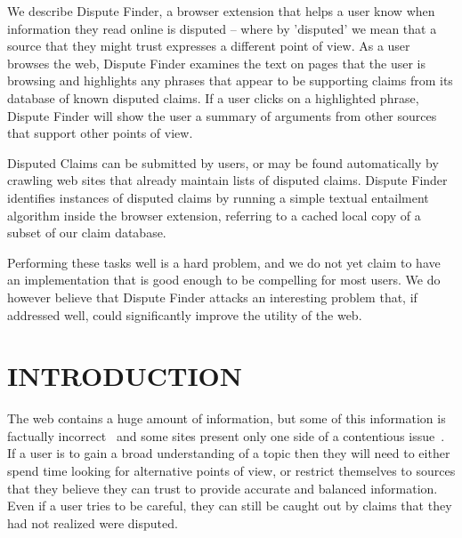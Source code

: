 \documentclass{www2010-submission}
\newcommand{\todo}[1]{}
\begin{document}
\abstract

We describe Dispute Finder, a browser extension that helps a user know when information they read online is disputed -- where by 'disputed' we mean that a source that they might trust expresses a different point of view.  As a user browses the web, Dispute Finder examines the text on pages that the user is browsing and highlights any phrases that appear to be supporting claims from its database of known disputed claims. If a user clicks on a highlighted phrase, Dispute Finder will show the user a summary of arguments from other sources that support other points of view.

Disputed Claims can be submitted by users, or may be found automatically by crawling web sites that already maintain lists of disputed claims. Dispute Finder identifies instances of disputed claims by running a simple textual entailment algorithm inside the browser extension, referring to a cached local copy of a subset of our claim database.

Performing these tasks well is a hard problem, and we do not yet claim to have an implementation that is good enough to be compelling for most users. We do however believe that Dispute Finder attacks an interesting problem that, if addressed well, could significantly improve the utility of the web.







\section{INTRODUCTION}

\todo{update screenshots}

The web contains a huge amount of information, but some of this information is factually incorrect~\cite{Neumann2003,Resnik1998,Zhou2004} and some sites present only one side of a contentious issue~\cite{Herman2002}. 
If a user is to gain a broad understanding of a topic then they will need to either spend time looking for alternative points of view, or restrict themselves to sources that they believe they can trust to provide accurate and balanced information.
Even if a user tries to be careful, they can still be caught out by claims that they had not realized were disputed.
\todo{word this better}\todo{update all screenshots}
\end{document}
